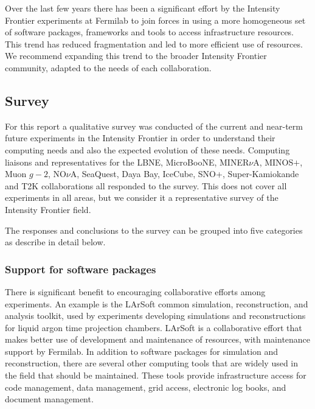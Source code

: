 Over the
last few years there has been a significant effort by the Intensity Frontier experiments at
Fermilab to join forces in using a more homogeneous set of software packages,
frameworks and tools to access infrastructure resources. This trend has
reduced fragmentation and led to more efficient use of resources. We recommend
expanding this trend to the broader Intensity Frontier community, adapted to the needs of each
collaboration.

\subsection{Survey}
For this report a qualitative survey was conducted of the current and near-term 
future experiments in the Intensity Frontier in order to understand their computing needs
and also the expected evolution of these needs.  Computing liaisons and
representatives for the LBNE, MicroBooNE, MINER$\nu$A, MINOS$+$, Muon $g-2$,
NO$\nu$A, SeaQuest,  Daya Bay, IceCube, SNO+, Super-Kamiokande and T2K
collaborations all responded to the survey. This does not cover all
experiments in all areas, but we consider it a representative survey of the Intensity Frontier
field.

The responses and conclusions to the survey can be grouped into five categories
as describe in detail below.  

\subsubsection{Support for software packages}
There is significant benefit to encouraging collaborative efforts
among experiments. An example is the LArSoft common simulation,
reconstruction, and analysis toolkit, used by experiments developing
simulations and reconstructions for liquid argon time projection chambers.
LArSoft is a collaborative effort that makes better use of development and
maintenance of resources, with maintenance support by Fermilab.  In
addition to software packages for simulation and reconstruction, there are
several other computing tools that are widely used in the field that should be
maintained.  These tools provide infrastructure access for code management,
data management, grid access, electronic log books, and document management.

